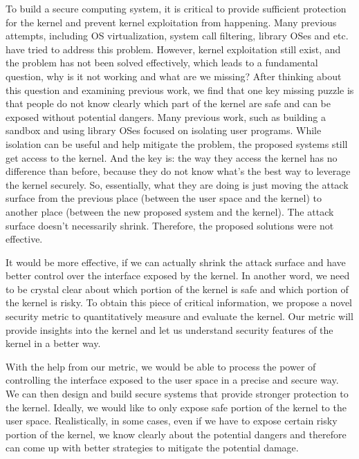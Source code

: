 To build a secure computing system, it is critical to provide sufficient protection for the kernel and 
prevent kernel exploitation from happening. Many previous attempts, including OS virtualization, 
system call filtering, library OSes and etc. have tried to address this problem. However, 
kernel exploitation still exist, and the problem has not been solved effectively, which leads to a 
fundamental question, why is it not working and what are we missing? After thinking about this
question and examining previous work, we find that one key missing puzzle is that people do not know 
clearly which part of the kernel are safe and can be exposed without potential dangers. Many previous
work, such as building a sandbox and using library OSes focused on isolating user programs. While isolation 
can be useful and help mitigate the problem, the proposed systems still get access to the kernel. 
And the key is: the way they access the kernel has no difference than before, because they do not 
know what's the best way to leverage the kernel securely. So, essentially, what they are doing is just moving 
the attack surface from the previous place (between the user space and the kernel) to another place 
(between the new proposed system and the kernel). The attack surface doesn't necessarily shrink. 
Therefore, the proposed solutions were not effective. 

It would be more effective, if we can actually shrink the attack surface and have better control over 
the interface exposed by the kernel. In another word, we need to be crystal clear about which portion of 
the kernel is safe and which portion of the kernel is risky. To obtain this piece of critical information, we
propose a novel security metric to quantitatively measure and evaluate the kernel. Our metric will provide
insights into the kernel and let us understand security features of the kernel in a better way. 

With the help from our metric, we would be able to process the power of controlling the interface 
exposed to the user space in a precise and secure way. We can then design and build secure systems 
that provide stronger protection to the kernel. Ideally, we would like to only expose safe portion 
of the kernel to the user space. Realistically, in some cases, even if we have to expose certain risky portion 
of the kernel, we know clearly about the potential dangers and therefore can come up with better 
strategies to mitigate the potential damage. 